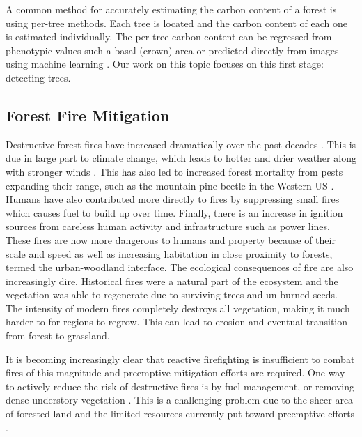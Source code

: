 A common method for accurately estimating the carbon content of a forest is using per-tree methods. Each tree is located and the carbon content of each one is estimated individually. The per-tree carbon content can be regressed from phenotypic values such a basal (crown) area \cite{Torres2013UsingMexico} or predicted directly from images using machine learning \cite{Reiersen2022ReforesTree:Imagery}. Our work on this topic focuses on this first stage: detecting trees.

\subsection{Forest Fire Mitigation} 
Destructive forest fires have increased dramatically over the past decades \cite{spreading_like_wildfire, ayanz2021, nfn2022}. This is due in large part to climate change, which leads to hotter and drier weather along with stronger winds \cite{spreading_like_wildfire}. This has also led to increased forest mortality from pests expanding their range, such as the mountain pine beetle in the Western US \cite{Jenkins2014AndFuels}. Humans have also contributed more directly to fires by suppressing small fires which causes fuel to build up over time. Finally, there is an increase in ignition sources from careless human activity and infrastructure such as power lines. These fires are now more dangerous to humans and property because of their scale and speed as well as increasing habitation in close proximity to forests, termed the urban-woodland interface. The ecological consequences of fire are also increasingly dire. Historical fires were a natural part of the ecosystem and the vegetation was able to regenerate due to surviving trees and un-burned seeds. The intensity of modern fires completely destroys all vegetation, making it much harder to for regions to regrow. This can lead to erosion and eventual transition from forest to grassland.

It is becoming increasingly clear that reactive firefighting is insufficient to combat fires of this magnitude and preemptive mitigation efforts are required. One way to actively reduce the risk of destructive fires is by fuel management, or removing dense understory vegetation \cite{Fire2021FuelsManagement, WildlandFireResiliencyProgram20214Plan, Agriculture2019HazardousComplex}. This is a challenging problem due to the sheer area of forested land and the limited resources currently put toward preemptive efforts \cite{spreading_like_wildfire}.

